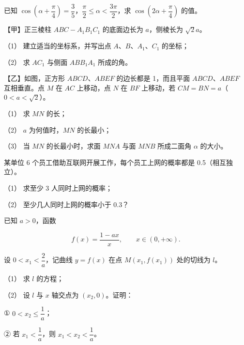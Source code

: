 \begin{question}
已知 $\cos\left(\alpha+\dfrac\pi4\right)=\dfrac35$，$\dfrac\pi2\leqslant\alpha<\dfrac{3\pi}2$，求 $\cos\left(2\alpha+\dfrac\pi4\right)$ 的值。

\Needspace{0.4\textheight}
\end{question}
\begin{question}
【甲】正三棱柱 $ABC-A_1B_1C_1$ 的底面边长为 $a$，侧棱长为 $\sqrt2a$。
\nopagebreak[4]
\begin{center}\end{center}
\nopagebreak[4]
（1） 建立适当的坐标系，并写出点 $A\text{、}B\text{、}A_1\text{、}C_1$ 的坐标；

（2） 求 $AC_1$ 与侧面 $ABB_1A_1$ 所成的角。

【乙】如图，正方形 $ABCD\text{、}ABEF$ 的边长都是 1，而且平面 $ABCD\text{、}ABEF$ 互相垂直。点 $M$ 在 $AC$ 上移动，点 $N$ 在 $BF$ 上移动，若 $CM=BN=a$（$0<a<\sqrt2$）。
\nopagebreak[4]
\begin{center}\end{center}
\nopagebreak[4]
（1） 求 $MN$ 的长；

（2） $a$ 为何值时，$MN$ 的长最小；

（3） 当 $MN$ 的长最小时，求面 $MNA$ 与面 $MNB$ 所成二面角 $\alpha$ 的大小。

\end{question}
\begin{question}
某单位 6 个员工借助互联网开展工作，每个员工上网的概率都是 0.5（相互独立）。

（1） 求至少 3 人同时上网的概率；

（2） 至少几人同时上网的概率小于 0.3？

\end{question}
\begin{question}
已知 $a>0$，函数

\nopagebreak[4]
\[
f(x)=\frac{1-ax}{x},\qquad x\in(0,+\infty).
\]

设 $0<x_1<\dfrac2a$，记曲线 $y=f(x)$ 在点 $M(x_1,f(x_1))$ 处的切线为 $l$。

（1） 求 $l$ 的方程；

（2） 设 $l$ 与 $x$ 轴交点为 $(x_2,0)$。证明：

① $0<x_2\leqslant\dfrac1a$；

② 若 $x_1<\dfrac1a$，则 $x_1<x_2<\dfrac1a$。

\end{question}
